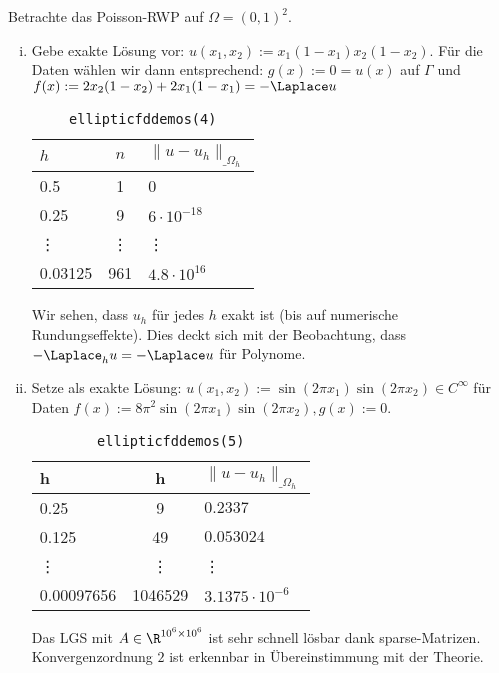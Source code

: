 \begin{ex*}
	Betrachte das Poisson-RWP auf $\Omega = (0,1)^2$.
	\begin{enumerate}[i)]
		\item
			Gebe exakte Lösung vor: $u(x_1, x_2) := x_1(1-x_1)x_2(1-x_2)$.
			Für die Daten wählen wir dann entsprechend: $g(x) := 0 = u(x)$ auf $\Gamma$ und $f(x) := 2x_2(1-x_2) + 2x_1(1-x_1) = -\Laplace u$
			\begin{table}[ht]
				\centering
				\begin{tabular}{l|c|l}
					$h$ & $n$ & $\|u - u_h\|_{\_\Omega_h}$ \\ \hline
					0.5 & 1 & 0 \\
					0.25 & 9 & $6 \cdot 10^{-18}$ \\
					\vdots & \vdots & \vdots \\
					0.03125 & 961 & $4.8 \cdot 10^{16}$
				\end{tabular}
				\caption{\texttt{elliptic\textunderscore fd\textunderscore demos(4)}}
			\end{table}
			Wir sehen, dass $u_h$ für jedes $h$ exakt ist (bis auf numerische Rundungseffekte).
			Dies deckt sich mit der Beobachtung, dass $-\Laplace_h u = - \Laplace u$ für Polynome.
		\item
			Setze als exakte Lösung: $u(x_1, x_2) := \sin(2\pi x_1) \sin(2\pi x_2) \in C^\infty$ für Daten $f(x) := 8\pi^2 \sin(2\pi x_1) \sin(2\pi x_2), g(x) := 0$.
			\begin{table}[ht]
				\centering
				\begin{tabular}{l|cl}
					h & h & $\|u - u_h\|_{\_\Omega_h}$ \\ \hline
					0.25 & 9 & $0.2337$ \\
					0.125 & 49 & $0.053024$ \\
					\vdots & \vdots & \vdots \\
					0.00097656 & 1046529 & $3.1375 \cdot 10^{-6}$
				\end{tabular}
				\caption{\texttt{elliptic\textunderscore fd\textunderscore demos(5)}}
			\end{table}

			Das LGS mit $A \in \R^{10^6 \times 10^6}$ ist sehr schnell lösbar dank sparse-Matrizen.
			Konvergenzordnung $2$ ist erkennbar in Übereinstimmung mit der Theorie.
	\end{enumerate}
\end{ex*}

